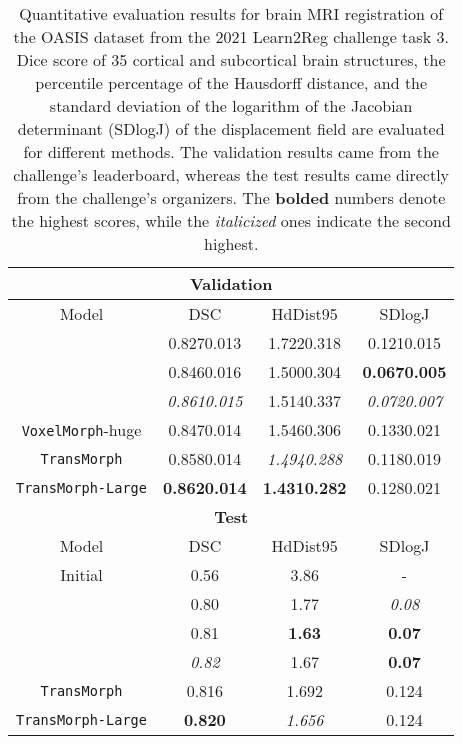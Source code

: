 \documentclass[times,twocolumn,final]{elsarticle}
\begin{document}
\begin{table}[!t]
\fontsize{8}{9.5}\selectfont
\parbox{\linewidth}{
\centering
\caption{Quantitative evaluation results for brain MRI registration of the OASIS dataset from the 2021 Learn2Reg challenge task 3. Dice score of 35 cortical and subcortical brain structures, the  percentile percentage of the Hausdorff distance, and the standard deviation of the logarithm of the Jacobian determinant (SDlogJ) of the displacement field are evaluated for different methods. The validation results came from the challenge's leaderboard, whereas the test results came directly from the challenge's organizers. The \textbf{bolded} numbers denote the highest scores, while the \textit{italicized} ones indicate the second highest.}
\label{tab:table_res_OASIS}

\begin{tabular}{ c | c | c | c }
\hline
 \multicolumn{4}{c}{\textbf{Validation}}\\
 \hline
 Model & DSC & HdDist95 & SDlogJ\\
 \hline
 \cite{lv2022joint} & 0.8270.013 & 1.7220.318 & 0.1210.015\\
 \hline
 \cite{siebert2021fast} &  0.8460.016 & 1.5000.304 & \textbf{0.0670.005} \\
 \hline
 \cite{mok2021conditional} & \textit{0.8610.015} & 1.5140.337 & \textit{0.0720.007}\\
 \hline
 \texttt{VoxelMorph}-huge & 0.8470.014& 1.5460.306 & 0.1330.021\\
 \hline
 \texttt{TransMorph} & 0.8580.014 & \textit{1.4940.288} & 0.1180.019 \\
 \hline
 \texttt{TransMorph-Large} & \textbf{0.8620.014} & \textbf{1.4310.282} & 0.1280.021 \\
 \hline
 \hline
 \multicolumn{4}{c}{\textbf{Test}}\\
 \hline
 Model & DSC & HdDist95 & SDlogJ\\
 \hline
 Initial & 0.56 & 3.86 & -\\
 \hline
 \cite{lv2022joint} & 0.80 & 1.77 & \textit{0.08}\\
 \hline
 \cite{siebert2021fast} & 0.81 & \textbf{1.63} & \textbf{0.07}\\
 \hline
 \cite{mok2021conditional} & \textit{0.82}  & 1.67 & \textbf{0.07} \\
 \hline
 \texttt{TransMorph} & 0.816 & 1.692 & 0.124\\
 \hline
 \texttt{TransMorph-Large} & \textbf{0.820} & \textit{1.656} & 0.124 \\
 \hline
\end{tabular}}
\end{table}
\end{document}
